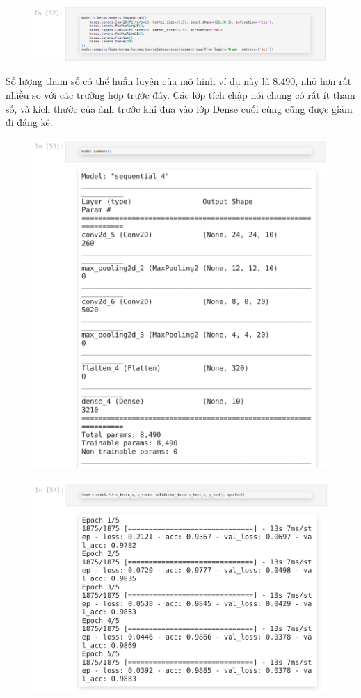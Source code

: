 \documentclass{book}
\begin{document}
\begin{figure}[H]
    \centering
    \includegraphics[width=1.0\linewidth]{images/code8.png}
    \label{fig:code8}
\end{figure}
Số lượng tham số có thể huấn luyện của mô hình ví dụ này là 8.490, nhỏ hơn rất nhiều so với các trường hợp trước đây. Các lớp tích chập nói chung có rất ít tham số, và kích thước của ảnh trước khi đưa vào lớp Dense cuối cùng cũng được giảm đi đáng kể.
\begin{figure}[H]
    \centering
    \includegraphics[width=0.85\linewidth]{images/code9.png}
    \label{fig:code9}
\end{figure}
\begin{figure}[H]
    \centering
    \includegraphics[width=0.85\linewidth]{images/code10.png}
    \label{fig:code10}
\end{figure}
\end{document}
